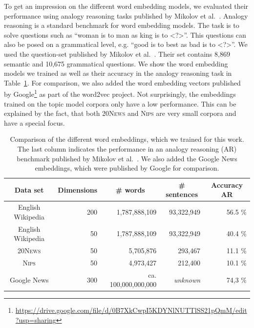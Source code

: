 \documentclass[
        a4paper,
        titlepage,
        twoside,
        parskip,
        numbers=noenddot
        ]{scrbook}
\newcommand{\ra}[1]{\renewcommand{\arraystretch}{#1}}
\theoremstyle{break}
\begin{document}
To get an impression on the different word embedding models, we evaluated their performance using analogy reasoning tasks published by Mikolov et al.~\cite{Mikolov2013}.
Analogy reasoning is a standard benchmark for word embedding models.
The task is to solve questions such as ``woman is to man as king is to \textless?\textgreater''.
This questions can also be posed on a grammatical level, e.g. ``good is to best as bad is to \textless?\textgreater''.
We used the question-set published by Mikolov et al.~\cite{Mikolov2013b}.
Their set contains 8,869 semantic and 10,675 grammatical questions.
We show the word embedding models we trained as well as their accuracy in the analogy reasoning task in Table~\ref{table:word_embeddings_performance}.
For comparison, we also added the word embedding vectors published by Google\footnote{\url{https://drive.google.com/file/d/0B7XkCwpI5KDYNlNUTTlSS21pQmM/edit?usp=sharing}} as part of the word2vec project.
Not surprisingly, the embeddings trained on the topic model corpora only have a low performance.
This can be explained by the fact, that both \textsc{20News} and \textsc{Nips} are very small corpora and have a special focus.

\begin{table}[]
  \ra{1.3}
  \centering
  \caption{Comparison of the different word embeddings, which we trained for this work.
  The last column indicates the performance in an analogy reasoning (AR) benchmark published by Mikolov et al.~\cite{Mikolov2013b}.
  We also added the Google News embeddings, which were published by Google for comparison.}
  \label{table:word_embeddings_performance}
  \begin{tabular}{crrrr}
    \toprule
    \multicolumn{1}{c}{Data set} & \multicolumn{1}{c}{Dimensions} & \multicolumn{1}{c}{\# words} & \multicolumn{1}{c}{\# sentences} & \multicolumn{1}{c}{Accuracy AR} \\
    \midrule
    English Wikipedia & 200                 & 1,787,888,109     & 93,322,949            & 56.5 \%              \\
    English Wikipedia & 50                  & 1,787,888,109     & 93,322,949            & 40.4 \%              \\
    \textsc{20News}            & 50                  & 5,705,876         & 293,467               & 11.1 \%              \\
    \textsc{Nips}              & 50                  & 4,973,427         & 212,400               & 10.1 \%              \\
    Google News       & 300                 & ca. 100,000,000,000       & \textit{unknown}      & 74,3 \%              \\
    \bottomrule
  \end{tabular}
\end{table}
\end{document}
